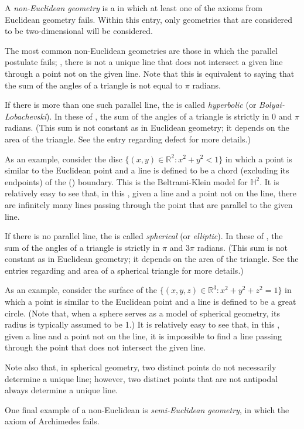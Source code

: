 \documentclass[12pt]{article}
\begin{document}

A \emph{non-Euclidean geometry} is a  in which at least one of the axioms from Euclidean geometry fails.  Within this entry, only geometries that are considered to be two-dimensional will be considered.

The most common non-Euclidean geometries are those in which the parallel postulate fails; , there is not a unique line that does not intersect a given line through a point not on the given line.  Note that this is equivalent to saying that the sum of the angles of a triangle is not equal to $\pi$ radians.

If there is more than one such parallel line, the  is called \emph{hyperbolic} (or \emph{Bolyai-Lobachevski}).  In these  of , the sum of the angles of a triangle is strictly in  $0$ and $\pi$ radians.  (This sum is not constant as in Euclidean geometry; it depends on the area of the triangle.  See the entry regarding defect for more details.)

As an example, consider the disc $\{(x,y) \in \mathbb{R}^2 : x^2+y^2<1 \}$ in which a point is similar to the Euclidean point and a line is defined to be a chord (excluding its endpoints) of the () boundary.  This is the Beltrami-Klein model for $\mathbb{H}^2$.  It is relatively easy to see that, in this , given a line and a point not on the line, there are infinitely many lines passing through the point that are parallel to the given line.

If there is no parallel line, the  is called \emph{spherical} (or \emph{elliptic}).  In these  of , the sum of the angles of a triangle is strictly in  $\pi$ and $3\pi$ radians.  (This sum is not constant as in Euclidean geometry; it depends on the area of the triangle.  See the entries regarding  and area of a spherical triangle for more details.)

As an example, consider the surface of the  $\{(x,y,z) \in \mathbb{R}^3 : x^2+y^2+z^2=1 \}$ in which a point is similar to the Euclidean point and a line is defined to be a great circle.  (Note that, when a sphere serves as a model of spherical geometry, its radius is typically assumed to be 1.)  It is relatively easy to see that, in this , given a line and a point not on the line, it is impossible to find a line passing through the point that does not intersect the given line.

Note also that, in spherical geometry, two distinct points do not necessarily determine a unique line; however, two distinct points that are not antipodal always determine a unique line.

One final example of a non-Euclidean  is \emph{semi-Euclidean geometry}, in which the axiom of Archimedes fails.
\end{document}
